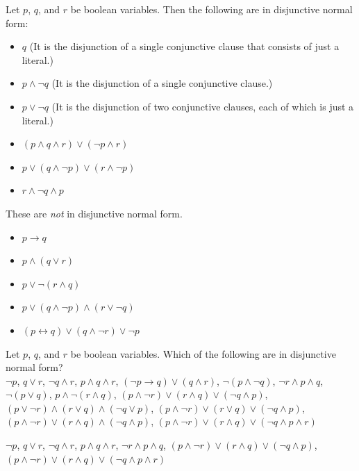 \begin{exa}
Let $p$, $q$, and $r$ be boolean variables.
Then the following are in disjunctive normal form:
\begin{itemize}
\item 
$q$ (It is the disjunction of a single conjunctive clause that consists of just a literal.)
\item
$p\wedge \neg q$  (It is the disjunction of a single conjunctive clause.)
\item
$p\vee \neg q$ (It is the disjunction of two conjunctive clauses, each of which is just a literal.)
\item
$(p\wedge q\wedge r)\vee(\neg p\wedge r)$
\item
$p\vee(q\wedge \neg p)\vee(r\wedge\neg p)$
\item
$r\wedge \neg q \wedge p$
\end{itemize}

\noindent
These are {\em not} in disjunctive normal form.
\begin{itemize}
\item
$p\rightarrow q$
\item
$p\wedge (q \vee r)$
\item
$p\vee \neg (r \wedge q)$
\item
$p\vee(q\wedge \neg p)\wedge(r\vee \neg q)$
\item
$(p\leftrightarrow q)\vee (q\wedge \neg r)\vee \neg p$
\end{itemize}
\end{exa}


\begin{exer}
Let $p$, $q$, and $r$ be boolean variables. 
Which of the following are in disjunctive normal form?\\
$\neg p$,
$q\vee r$, 
$\neg q\wedge r$, 
$p\wedge q \wedge r$, 
$(\neg p \rightarrow q)\vee (q\wedge r)$,  
$\neg(p \wedge \neg q)$,
$\neg r \wedge p \wedge q$,
$\neg(p \vee q)$,
$p \wedge \neg(r\wedge q)$,
$(p\wedge \neg r)\vee(r\wedge q) \vee (\neg q\wedge p)$,
$(p\vee \neg r)\wedge(r\vee q) \wedge (\neg q\vee p)$,
$(p\wedge \neg r)\vee(r\vee q) \vee (\neg q\wedge p)$,
$(p\wedge \neg r)\vee(r\wedge q) \wedge (\neg q\wedge p)$,
$(p\wedge \neg r)\vee(r\wedge q) \vee (\neg q\wedge p\wedge r)$
\\
\answerlinetwo
\begin{answer}
$\neg p$,
$q\vee r$, 
$\neg q\wedge r$, 
$p\wedge q \wedge r$,
$\neg r \wedge p \wedge q$,
$(p\wedge \neg r)\vee(r\wedge q) \vee (\neg q\wedge p)$,
$(p\wedge \neg r)\vee(r\wedge q) \vee (\neg q\wedge p\wedge r)$
\end{answer}
\end{exer}

